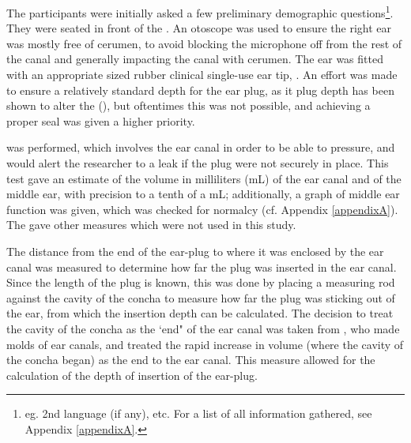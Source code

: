 The participants were initially asked a few preliminary demographic questions\footnote{eg. 2nd language (if any), etc. For a list of all information gathered, see Appendix \ref{appendixA}.}. They were seated in front of the \DIFdelbegin {}\DIFdelend \DIFaddbegin {}\DIFaddend .  An otoscope was used to ensure the right ear was mostly free of cerumen, to avoid blocking the microphone off from the rest of the canal and generally impacting the canal with cerumen.  The ear was fitted with an appropriate sized rubber clinical single-use ear tip, \DIFdelbegin {}\DIFdelend \DIFaddbegin {}\DIFaddend .  An effort was made to ensure a relatively standard depth for the ear plug, as it plug depth has been shown to alter the \DIFdelbegin {}\DIFdelend \DIFaddbegin {}\DIFaddend (\cite{dean:00,stenfelt:07}), but oftentimes this was not possible, and achieving a proper seal was given a higher priority.

\DIFdelbegin {}\DIFdelend \DIFaddbegin {}\DIFaddend was performed, which involves \DIFdelbegin {}\DIFdelend \DIFaddbegin {}\DIFaddend the ear canal in order to be able to \DIFdelbegin {}\DIFdelend \DIFaddbegin {}\DIFaddend pressure, and would alert the researcher to a leak if the plug were not securely in place.  This test gave an estimate of the volume in milliliters (mL) of the ear canal and of the middle ear, with precision to a tenth of a mL; additionally, a graph of middle ear function was given, which was checked for normalcy (cf. Appendix \ref{appendixA}).  The \DIFdelbegin {}\DIFdelend \DIFaddbegin {}\DIFaddend gave other measures which were not used in this study.

The distance from the end of the ear-plug to where it was enclosed by the ear canal was measured to determine how far the plug was inserted in the ear canal.
Since the length of the plug is known, this was done by placing a measuring rod against the cavity of the concha to measure how far the plug was sticking out of the ear, from which the insertion depth can be calculated. The decision to treat the cavity of the concha as the `end" of the ear canal was taken from \cite{stenfelt:07}, who made molds of ear canals, and treated the rapid increase in volume (where the cavity of the concha began) as the end to the ear canal.  This measure allowed for the calculation of the depth of insertion of the ear-plug.



